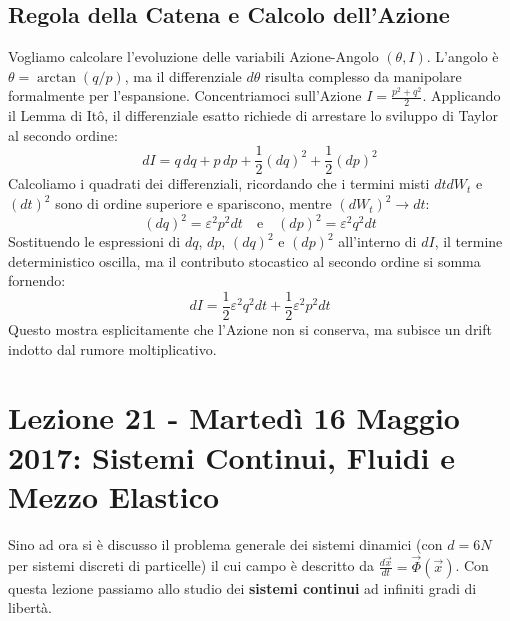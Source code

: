 \documentclass[12pt,a4paper]{article}
\begin{document}
\subsection{Regola della Catena e Calcolo dell'Azione}
Vogliamo calcolare l'evoluzione delle variabili Azione-Angolo $(\theta, I)$. L'angolo è $\theta = \arctan(q/p)$, ma il differenziale $d\theta$ risulta complesso da manipolare formalmente per l'espansione. 
Concentriamoci sull'Azione $I = \frac{p^2+q^2}{2}$. Applicando il Lemma di Itô, il differenziale esatto richiede di arrestare lo sviluppo di Taylor al secondo ordine:
\begin{equation}
dI = q\,dq + p\,dp + \frac{1}{2}(dq)^2 + \frac{1}{2}(dp)^2
\end{equation}
Calcoliamo i quadrati dei differenziali, ricordando che i termini misti $dt dW_t$ e $(dt)^2$ sono di ordine superiore e spariscono, mentre $(dW_t)^2 \to dt$:
\begin{equation}
(dq)^2 = \varepsilon^2 p^2 dt \quad \text{e} \quad (dp)^2 = \varepsilon^2 q^2 dt
\end{equation}
Sostituendo le espressioni di $dq$, $dp$, $(dq)^2$ e $(dp)^2$ all'interno di $dI$, il termine deterministico oscilla, ma il contributo stocastico al secondo ordine si somma fornendo:
\begin{equation}
dI = \frac{1}{2}\varepsilon^2 q^2 dt + \frac{1}{2}\varepsilon^2 p^2 dt
\end{equation}
Questo mostra esplicitamente che l'Azione non si conserva, ma subisce un drift indotto dal rumore moltiplicativo.

\newpage
\section{Lezione 21 - Martedì 16 Maggio 2017: Sistemi Continui, Fluidi e Mezzo Elastico}

Sino ad ora si è discusso il problema generale dei sistemi dinamici (con $d=6N$ per sistemi discreti di particelle) il cui campo è descritto da $\frac{d\vec{x}}{dt} = \vec{\Phi}(\vec{x})$. Con questa lezione passiamo allo studio dei \textbf{sistemi continui} ad infiniti gradi di libertà.
\end{document}

